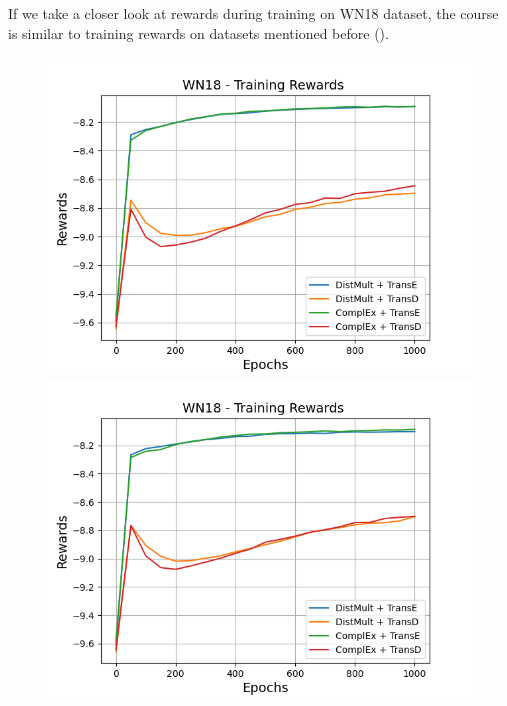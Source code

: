 If we take a closer look at rewards during training on \textsc{WN18} dataset, the course is similar to training rewards on datasets mentioned before ().
\begin{figure}
    \centering
    \begin{minipage}{.5\textwidth}
      \centering
      \includegraphics[width=0.9\linewidth]{figures/results/gan_train/not_pretrained/uncertainty/max_distribution/entropy/wn18/uncertainty_wn18_rew.png}
    \end{minipage}%
    \begin{minipage}{.5\textwidth}
      \centering
      \includegraphics[width=0.9\linewidth]{figures/results/gan_train/not_pretrained/uncertainty/max_distribution/least_confidence/wn18/uncertainty_wn18_rew.png}
    \end{minipage}
    \begin{minipage}{.5\textwidth}

\end{minipage}
\end{figure}
